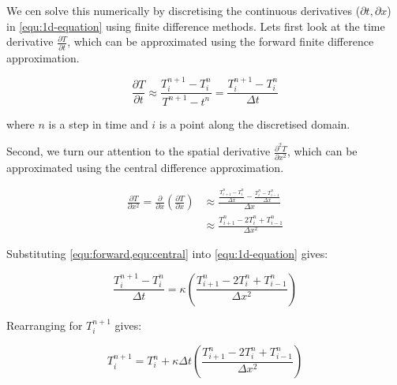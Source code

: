 \documentclass[a4page, twocolumn, twoside, 11pt]{article}
\begin{document}
We cen solve this numerically by discretising the continuous derivatives ($\partial t, \partial x$) in \cref{equ:1d-equation} using finite difference methods. Lets first look at the time derivative $\frac{\partial T}{\partial t}$, which can be approximated using the forward finite difference approximation.

\begin{equation}
  \frac{\partial T}{\partial t} \approx \frac{ T^{n+1}_{i}-T^{n}_{i} }{ T^{n+1}-t^{n} } = \frac{ T^{n+1}_{i}-T^{n}_{i} }{ \Delta t }
  \label{equ:forward}
\end{equation}

\noindent where $n$ is a step in time and $i$ is a point along the discretised domain.

Second, we turn our attention to the spatial derivative $\frac{\partial^2 T}{\partial x^2}$, which can be approximated using the central difference approximation.

\begin{equation}
  \begin{split}
    \frac{\partial T}{\partial x^2} = \frac{\partial}{\partial x}\left(\frac{\partial T}{\partial x}\right) & \approx \frac{ \frac{ T^{n}_{i+1}-T^{n}_{i} }{ \Delta x } - \frac{ T^{n}_{i}-T^{n}_{i-1} }{ \Delta x } }{\Delta x} \\ & \approx \frac{T^n_{i+1}-2T^n_i+T^n_{i-1}}{\Delta x^2}
  \end{split}
  \label{equ:central}
\end{equation}

Substituting \cref{equ:forward,equ:central} into \cref{equ:1d-equation} gives:

\begin{equation}
  \frac{T^{n+1}_{i}-T^{n}_{i}}{\Delta t} = \kappa \left(\frac{T^n_{i+1}-2T^n_i+T^n_{i-1}}{\Delta x^2}\right)
\end{equation}

Rearranging for $T^{n+1}_{i}$ gives:

\begin{equation}
  T^{n+1}_{i} = T^{n}_{i} + \kappa\Delta t \left(\frac{T^n_{i+1}-2T^n_i+T^n_{i-1}}{\Delta x^2}\right)
\end{equation}
\end{document}
